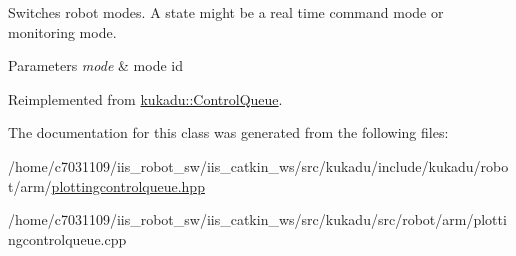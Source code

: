 Switches robot modes. A state might be a real time command mode or monitoring mode. 


\begin{DoxyParams}{Parameters}
{\em mode} & mode id \\
\hline
\end{DoxyParams}


Reimplemented from \hyperlink{classkukadu_1_1ControlQueue_a5defe63d9f1b9829676f9a31a4683911}{kukadu\-::\-Control\-Queue}.



The documentation for this class was generated from the following files\-:\begin{DoxyCompactItemize}
\item 
/home/c7031109/iis\-\_\-robot\-\_\-sw/iis\-\_\-catkin\-\_\-ws/src/kukadu/include/kukadu/robot/arm/\hyperlink{plottingcontrolqueue_8hpp}{plottingcontrolqueue.\-hpp}\item 
/home/c7031109/iis\-\_\-robot\-\_\-sw/iis\-\_\-catkin\-\_\-ws/src/kukadu/src/robot/arm/plottingcontrolqueue.\-cpp\end{DoxyCompactItemize}
